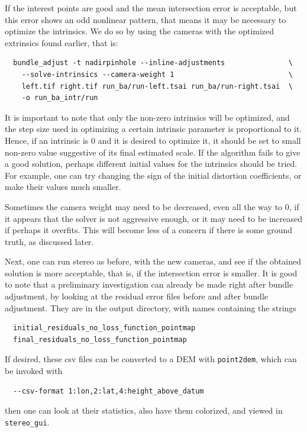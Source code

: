 If the interest points are good and the mean intersection error is
acceptable, but this error shows an odd nonlinear pattern, that means
it may be necessary to optimize the intrinsics. We do so by using the
cameras with the optimized extrinsics found earlier, that is:

\begin{verbatim}
  bundle_adjust -t nadirpinhole --inline-adjustments               \
    --solve-intrinsics --camera-weight 1                           \
    left.tif right.tif run_ba/run-left.tsai run_ba/run-right.tsai  \
    -o run_ba_intr/run
\end{verbatim}

It is important to note that only the non-zero intrinsics will be
optimized, and the step size used in optimizing a certain intrinsic
parameter is proportional to it. Hence, if an intrinsic is 0 and it is
desired to optimize it, it should be set to small non-zero value
suggestive of its final estimated scale. If the algorithm fails to give
a good solution, perhaps different initial values for the intrinsics
should be tried. For example, one can try changing the sign of the
initial distortion coefficients, or make their values much smaller.

Sometimes the camera weight may need to be decreased, even all the way
to 0, if it appears that the solver is not aggressive enough, or it may
need to be increased if perhaps it overfits. This will become less of a
concern if there is some ground truth, as discussed later.

Next, one can run stereo as before, with the new cameras, and
see if the obtained solution is more acceptable, that is, if the
intersection error is smaller. It is good to note that a preliminary
investigation can already be made right after bundle adjustment, by
looking at the residual error files before and after bundle
adjustment. They are in the output directory, with names containing the
strings
\begin{verbatim}
  initial_residuals_no_loss_function_pointmap
  final_residuals_no_loss_function_pointmap
\end{verbatim}

If desired, these csv files can be converted to a DEM with
\texttt{point2dem}, which can be invoked with
\begin{verbatim}
  --csv-format 1:lon,2:lat,4:height_above_datum
\end{verbatim}

then one can look at their statistics, also have them colorized,
and viewed in \texttt{stereo\_gui}.

